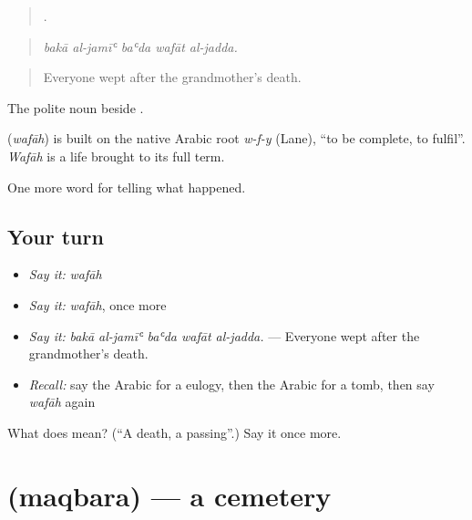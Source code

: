 \begin{quote}
    .
\end{quote}

\begin{quote}
\emph{bakā al-jamīʿ baʿda wafāt al-jadda.}
\end{quote}

\begin{quote}
Everyone wept after the grandmother’s death.
\end{quote}

The polite noun beside .

\begin{cousinweb}
\textbf{} (\emph{wafāh}) is built on the native Arabic root \emph{w-f-y} (Lane), \textquotedblleft{}to be complete, to fulfil\textquotedblright{}. \emph{Wafāh} is a life brought to its full term.
\end{cousinweb}

\begin{grammarlens}[title={What you've built}]
One more word for telling what happened.
\end{grammarlens}

\subsection*{Your turn}
\begin{itemize}
\raggedright
  \item \emph{Say it:} \emph{wafāh}
  \item \emph{Say it:} \emph{wafāh}, once more
  \item \emph{Say it:} \emph{bakā al-jamīʿ baʿda wafāt al-jadda.} — Everyone wept after the grandmother’s death.
  \item \emph{Recall:} say the Arabic for a eulogy, then the Arabic for a tomb, then say \emph{wafāh} again
\end{itemize}

\begin{tcolorbox}[breakable,colback=teal!4,colframe=teal!35!black,title={Before you move on}]
What does  mean? (\textquotedblleft{}A death, a passing\textquotedblright{}.) Say it once more.
\end{tcolorbox}
\section[\texorpdfstring{\ar{مقبرة} (maqbara)}{مقبرة (maqbara)}]{ (maqbara) — a cemetery}

